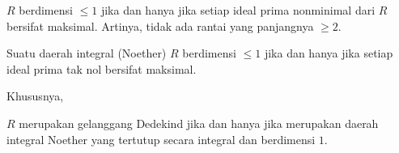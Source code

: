 \begin{remark} 
$R$ berdimensi $\leq 1$ jika dan hanya jika setiap ideal prima nonminimal dari $R$
bersifat maksimal. Artinya, tidak ada rantai yang panjangnya $\geq 2$.
\end{remark} 

\begin{remark} 
Suatu daerah integral (Noether) $R$ berdimensi $\leq 1$ jika dan hanya jika setiap ideal prima tak nol
bersifat maksimal.
\end{remark} 

Khususnya,
\begin{proposition} 
$R$ merupakan gelanggang Dedekind jika dan hanya jika merupakan daerah integral Noether yang tertutup secara integral dan berdimensi
$1$. 
\end{proposition} 
	
	
